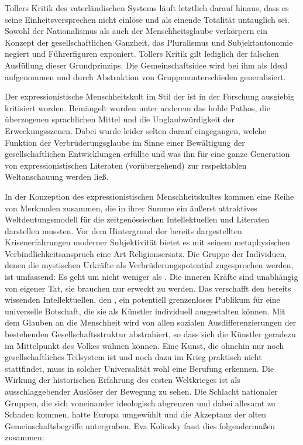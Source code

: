Tollers Kritik des vaterländischen Systems läuft letztlich darauf hinaus, dass
es seine Einheitsversprechen nicht einlöse und als einende Totalität
untauglich sei. Sowohl der Nationalismus als auch der Menschheitsglaube
verkörpern ein Konzept der gesellschaftlichen Ganzheit, das Pluralismus und
Subjektautonomie negiert und Führerfiguren exponiert. Tollers Kritik gilt
lediglich der falschen Ausfüllung dieser Grundprinzips. Die Gemeinschaftsidee
wird bei ihm als Ideal aufgenommen und durch Abstraktion von
Gruppenunterschieden generalisiert. 


Der expressionistische Menschheitskult im Stil der  ist in
der Forschung ausgiebig kritisiert worden. Bemängelt wurden unter anderem das
hohle Pathos, die überzogenen sprachlichen Mittel und die Unglaubwürdigkeit
der Erweckungsszenen.
Dabei wurde leider selten darauf eingegangen, welche Funktion der
Verbrüderungsglaube im Sinne einer Bewältigung der gesellschaftlichen
Entwicklungen erfüllte und was ihn für eine ganze Generation von
expressionistischen Literaten (vorübergehend) zur respektablen Weltanschauung
werden ließ.

In der Konzeption des expressionistischen Menschheitskultes kommen eine Reihe
von Merkmalen zusammen, die in ihrer Summe ein äußerst attraktives
Weltdeutungsmodell für die zeitgenössischen Intellektuellen und Literaten
darstellen mussten. Vor dem Hintergrund der bereits dargestellten
Krisenerfahrungen moderner Subjektivität bietet es mit seinem metaphysischen
Verbindlichkeitsanspruch eine Art Religionsersatz. Die Gruppe der Individuen,
denen die mystischen Urkräfte als Verbrüderungspotential zugesprochen werden,
ist umfassend: Es geht um nicht weniger als . 
Die inneren Kräfte
sind unabhängig von eigener Tat, sie brauchen nur erweckt zu werden. Das
verschafft den bereits wissenden Intellektuellen, den , ein
potentiell grenzenloses Publikum für eine universelle Botschaft, die sie als
Künstler individuell ausgestalten können. Mit dem Glauben an die
Menschheit wird von allen sozialen Ausdifferenzierungen der bestehenden
Gesellschaftsstruktur abstrahiert, so dass sich die Künstler \Cite{als
  Menschen} geradezu im Mittelpunkt des Volkes wähnen können. Eine Kunst, die
ohnehin nur noch gesellschaftliches Teilsystem ist und noch dazu im Krieg
praktisch nicht stattfindet, muss in solcher Universalität wohl eine Berufung
erkennen.  Die Wirkung der historischen Erfahrung des ersten Weltkrieges ist
als ausschlaggebender Auslöser der Bewegung zu sehen. Die Schlacht nationaler
Gruppen, die sich voneinander ideologisch abgrenzen und dabei allesamt
\Cite{als Menschen} zu Schaden kommen, hatte Europa umgewühlt und die
Akzeptanz der alten Gemeinschaftsbegriffe untergraben. Eva Kolinsky fasst dies
folgendermaßen zusammen:


